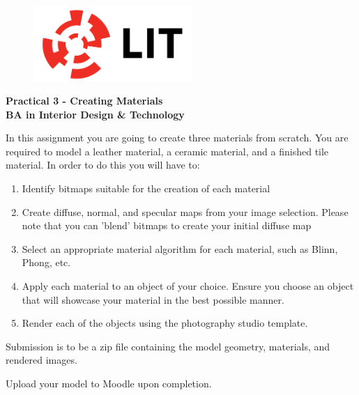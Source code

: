 
	

\newpage
\setcounter{page}{1}
\begin{center}
	\begin{figure}[ht]
		\centering
		\includegraphics[width = 6cm]{img/LITlogo.jpg}
		\label{fig:logoa3}
	\end{figure}
	\Large\textbf{Practical 3 - Creating Materials}\\
	\large\textbf{BA in Interior Design \& Technology}
\end{center}
In this assignment you are going to create three materials from scratch.  You are required to model a leather material, a ceramic material, and a finished tile material.  In order to do this you will have to:
\begin{enumerate}
	\item Identify bitmaps suitable for the creation of each material
	\item Create diffuse, normal, and specular maps from your image selection.  Please note that you can 'blend' bitmaps to create your initial diffuse map
	\item Select an appropriate material algorithm for each material, such as Blinn, Phong, etc.
	\item Apply each material to an object of your choice.  Ensure you choose an object that will showcase your material in the best possible manner.
	\item Render each of the objects using the photography studio template.
\end{enumerate}

Submission is to be a zip file containing the model geometry, materials, and rendered images.

Upload your model to Moodle upon completion.


